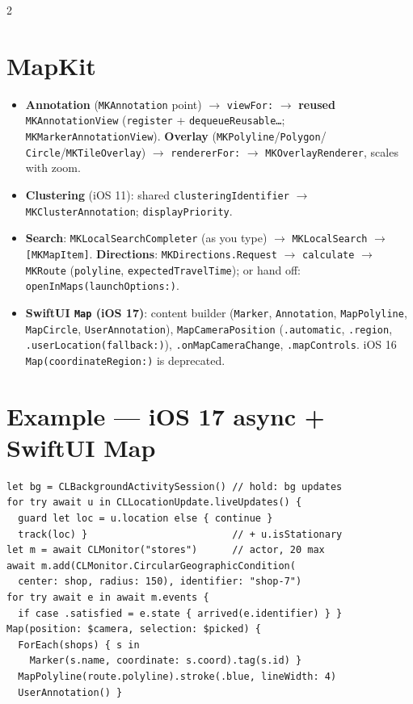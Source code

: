 \documentclass[8pt]{extarticle}
\begin{document}
\begin{multicols}{2}
\section{MapKit}
\begin{itemize}
  \item \textbf{Annotation} (\texttt{MKAnnotation} point) $\to$ \texttt{viewFor:}
        $\to$ \textbf{reused} \texttt{MKAnnotationView} (\texttt{register} +
        \texttt{dequeueReusable\dots}; \texttt{MKMarkerAnnotationView}).
        \textbf{Overlay} (\texttt{MKPolyline}/\allowbreak\texttt{Polygon}/\allowbreak
        \texttt{Circle}/\allowbreak\texttt{MKTileOverlay}) $\to$ \texttt{rendererFor:}
        $\to$ \texttt{MKOverlayRenderer}, scales with zoom.
  \item \textbf{Clustering} (iOS 11): shared \texttt{clusteringIdentifier} $\to$
        \texttt{MKClusterAnnotation}; \texttt{displayPriority}.
  \item \textbf{Search}: \texttt{MKLocalSearchCompleter} (as you type) $\to$
        \texttt{MKLocalSearch} $\to$ \texttt{[MKMapItem]}. \textbf{Directions}:
        \texttt{MKDirections.Request} $\to$ \texttt{calculate} $\to$ \texttt{MKRoute}
        (\texttt{polyline}, \texttt{expectedTravelTime}); or hand off:
        \texttt{openInMaps(\allowbreak launchOptions:)}.
  \item \textbf{SwiftUI \texttt{Map} (iOS 17)}: content builder (\texttt{Marker},
        \texttt{Annotation}, \texttt{MapPolyline}, \texttt{MapCircle},
        \texttt{UserAnnotation}), \texttt{MapCameraPosition} (\texttt{.automatic},
        \texttt{.region}, \texttt{.userLocation(\allowbreak fallback:)}),
        \texttt{.onMapCameraChange}, \texttt{.mapControls}. iOS 16
        \texttt{Map(coordinateRegion:)} is deprecated.
\end{itemize}

\section{Example — iOS 17 async + SwiftUI Map}
\begin{lstlisting}[language=SwiftSheet]
let bg = CLBackgroundActivitySession() // hold: bg updates
for try await u in CLLocationUpdate.liveUpdates() {
  guard let loc = u.location else { continue }
  track(loc) }                         // + u.isStationary
let m = await CLMonitor("stores")      // actor, 20 max
await m.add(CLMonitor.CircularGeographicCondition(
  center: shop, radius: 150), identifier: "shop-7")
for try await e in await m.events {
  if case .satisfied = e.state { arrived(e.identifier) } }
Map(position: $camera, selection: $picked) {
  ForEach(shops) { s in
    Marker(s.name, coordinate: s.coord).tag(s.id) }
  MapPolyline(route.polyline).stroke(.blue, lineWidth: 4)
  UserAnnotation() }
\end{lstlisting}


\end{multicols}
\end{document}
